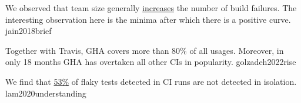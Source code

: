 \documentclass{article}
\begin{document}
  {We observed that team size generally \ul{increases} the number of build failures. The interesting observation here is the minima after which there is a positive curve.}
  {jain2018brief}


  {Together with Travis, GHA covers more than 80\% of all usages. Moreover, in only 18 months GHA has overtaken all other CIs in popularity.}
  {golzadeh2022rise}

  {We find that \ul{53\%} of flaky tests detected in CI runs are not detected in isolation.}
  {lam2020understanding}
\end{document}
